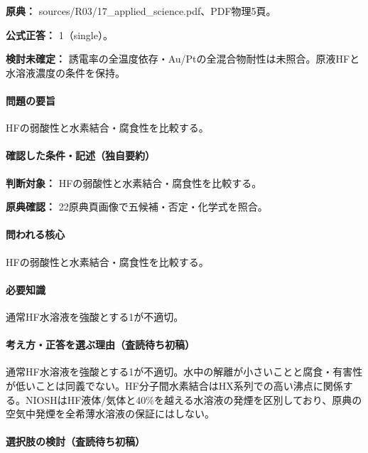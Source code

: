 \noindent\textbf{原典：} sources/R03/17\_applied\_science.pdf、PDF物理5頁。

\textbf{公式正答：} 1（single）。

\par\textbf{検討未確定：} 誘電率の全温度依存・Au/Ptの全混合物耐性は未照合。原液HFと水溶液濃度の条件を保持。

\paragraph{問題の要旨} HFの弱酸性と水素結合・腐食性を比較する。

\paragraph{確認した条件・記述（独自要約）}\mbox{}\par

\noindent\textbf{判断対象：} HFの弱酸性と水素結合・腐食性を比較する。\par

\noindent\textbf{原典確認：} 22原典頁画像で五候補・否定・化学式を照合。\par

\paragraph{問われる核心} HFの弱酸性と水素結合・腐食性を比較する。

\paragraph{必要知識} 通常HF水溶液を強酸とする1が不適切。

\paragraph{考え方・正答を選ぶ理由（査読待ち初稿）} 通常HF水溶液を強酸とする1が不適切。水中の解離が小さいことと腐食・有害性が低いことは同義でない。HF分子間水素結合はHX系列での高い沸点に関係する。NIOSHはHF液体/気体と40\%を越える水溶液の発煙を区別しており、原典の空気中発煙を全希薄水溶液の保証にはしない。

\paragraph{選択肢の検討（査読待ち初稿）}\mbox{}\par

